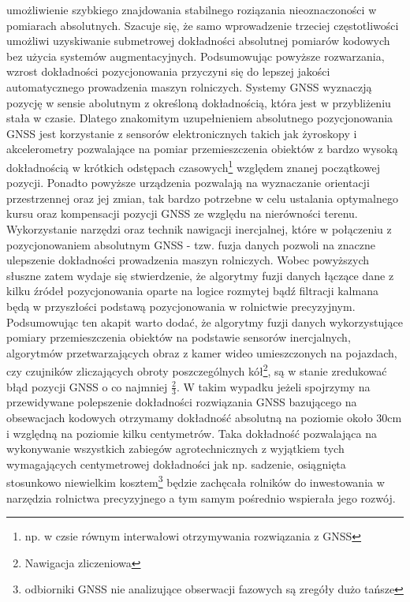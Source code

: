 umożliwienie szybkiego znajdowania stabilnego roziązania nieoznaczoności w pomiarach absolutnych. Szacuje się, że samo wprowadzenie trzeciej częstotliwości umożliwi 
uzyskiwanie submetrowej dokładności absolutnej pomiarów kodowych bez użycia systemów augmentacyjnych. Podsumowując powyższe rozwarzania, wzrost dokładności pozycjonowania 
przyczyni się do lepszej jakości automatycznego prowadzenia maszyn rolniczych.\newline
\indent Systemy GNSS wyznaczją pozycję w sensie abolutnym z określoną dokładnością, która jest w przybliżeniu stała w czasie. Dlatego znakomitym 
uzupełnieniem absolutnego pozycjonowania GNSS jest korzystanie z sensorów elektronicznych takich jak żyroskopy i akcelerometry pozwalające na 
pomiar przemieszczenia obiektów z bardzo wysoką dokładnością w krótkich odstępach czasowych\footnote{np. w czsie równym interwałowi otrzymywania rozwiązania z GNSS}
względem znanej początkowej pozycji. Ponadto powyższe urządzenia pozwalają na wyznaczanie orientacji przestrzennej oraz jej zmian, tak bardzo potrzebne w celu 
ustalania optymalnego kursu oraz kompensacji pozycji GNSS ze względu na nierówności terenu. Wykorzystanie narzędzi oraz technik nawigacji inercjalnej, które w połączeniu 
z pozycjonowaniem absolutnym GNSS - tzw. fuzja danych pozwoli na znaczne ulepszenie dokładności prowadzenia maszyn rolniczych. Wobec powyższych słuszne zatem wydaje się 
stwierdzenie, że algorytmy fuzji danych łączące dane z kilku źródeł pozycjonowania oparte na logice rozmytej bądź filtracji kalmana będą w przyszłości podstawą
pozycjonowania w rolnictwie precyzyjnym. Podsumowując ten akapit warto dodać, że algorytmy fuzji danych wykorzystujące pomiary przemieszczenia obiektów na podstawie 
sensorów inercjalnych, algorytmów przetwarzających obraz z kamer wideo umieszczonych na pojazdach, czy czujników zliczających obroty poszczególnych kół\footnote{
Nawigacja zliczeniowa}, są w stanie zredukować błąd pozycji GNSS o co najmniej $\frac{2}{3}$. W takim wypadku jeżeli spojrzymy na przewidywane polepszenie dokładności 
rozwiązania GNSS bazującego na obsewacjach kodowych otrzymamy dokładność absolutną na poziomie około 30cm i względną na poziomie kilku centymetrów. 
Taka dokładność pozwalająca na wykonywanie wszystkich zabiegów agrotechnicznych z wyjątkiem tych wymagających centymetrowej dokładności jak np. sadzenie, osiągnięta 
stosunkowo niewielkim kosztem\footnote{odbiorniki GNSS nie analizujące obserwacji fazowych są zregóły dużo tańsze} będzie zachęcała rolników do inwestowania 
w narzędzia rolnictwa precyzyjnego a tym samym pośrednio wspierała jego rozwój.\newline

